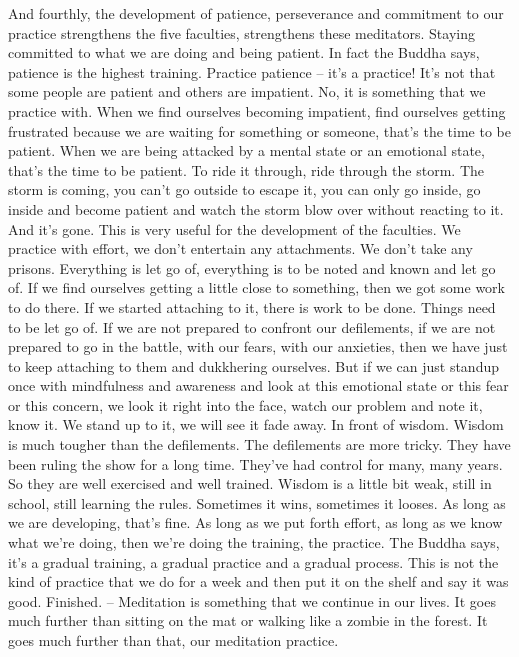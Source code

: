 \documentclass[letterpaper,10pt,english]{sphinxmanual}
\begin{document}
\sphinxAtStartPar
And fourthly, the development of patience, perseverance and commitment to our practice strengthens the five faculties, strengthens these meditators.  Staying  committed  to  what  we  are  doing  and  being  patient.  In  fact
the Buddha says, patience is the highest training. Practice patience – it’s a
practice! It’s not that some people are patient and others are impatient. No,
it  is  something  that  we  practice  with.  When  we  find  ourselves  becoming
impatient, find ourselves getting frustrated because we are waiting for something or someone, that’s the time to be patient. When we are being attacked
by a mental state or an emotional state, that’s the time to be patient. To ride
it through, ride through the storm. The storm is coming, you can’t go outside to escape it, you can only go inside, go inside and become patient and
watch the storm blow over without reacting to it. And it’s gone. This is very
useful for the development of the faculties. We practice with effort, we don’t
entertain any attachments. We don’t take any prisons. Everything is let go
of, everything is to be noted and known and let go of. If we find ourselves
getting a little close to something, then we got some work to do there. If we
started attaching to it, there is work to be done. Things need to be let go of.
If we are not prepared to confront our defilements, if we are not prepared to
go in the battle, with our fears, with our anxieties, then we have just to keep
attaching to them and dukkhering ourselves. But if we can just stand\sphinxhyphen{}up once
with mindfulness and awareness and look at this emotional state or this fear
or this concern, we look it right into the face, watch our problem and note
it, know it. We stand up to it, we will see it fade away. In front of wisdom.
  Wisdom  is  much  tougher  than  the  defilements.  The  defilements  are  more
tricky. They have been ruling the show for a long time. They’ve had control
for many, many years. So they are well exercised and well trained. Wisdom
is a little bit weak, still in school, still learning the rules. Sometimes it wins,
sometimes it looses. As long as we are developing, that’s fine. As long as
we put forth effort, as long as we know what we’re doing, then we’re doing
the training, the practice. The Buddha says, it’s a gradual training, a gradual
practice and a gradual process. This is not the kind of practice that we do for
a week and then put it on the shelf and say it was good. Finished. – Meditation  is  something  that  we  continue  in  our  lives.  It  goes  much  further  than
sitting on the mat or walking like a zombie in the forest. It goes much further
than that, our meditation practice.
\end{document}
